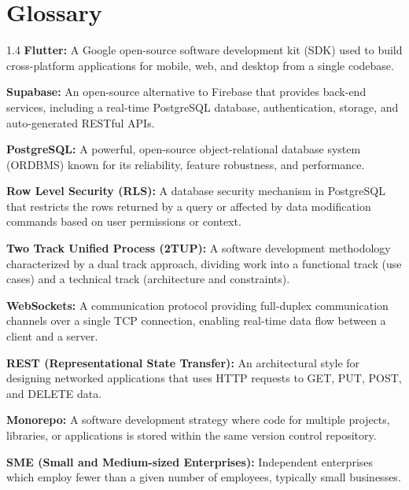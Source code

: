 \chapter*{Glossary}
\begin{spacing}{1.4}
\noindent\textbf{Flutter:} A Google open-source software development kit (SDK) used to build cross-platform applications for mobile, web, and desktop from a single codebase.

\noindent\textbf{Supabase:} An open-source alternative to Firebase that provides back-end services, including a real-time PostgreSQL database, authentication, storage, and auto-generated RESTful APIs.

\noindent\textbf{PostgreSQL:} A powerful, open-source object-relational database system (ORDBMS) known for its reliability, feature robustness, and performance.

\noindent\textbf{Row Level Security (RLS):} A database security mechanism in PostgreSQL that restricts the rows returned by a query or affected by data modification commands based on user permissions or context.

\noindent\textbf{Two Track Unified Process (2TUP):} A software development methodology characterized by a dual track approach, dividing work into a functional track (use cases) and a technical track (architecture and constraints).

\noindent\textbf{WebSockets:} A communication protocol providing full-duplex communication channels over a single TCP connection, enabling real-time data flow between a client and a server.

\noindent\textbf{REST (Representational State Transfer):} An architectural style for designing networked applications that uses HTTP requests to GET, PUT, POST, and DELETE data.

\noindent\textbf{Monorepo:} A software development strategy where code for multiple projects, libraries, or applications is stored within the same version control repository.

\noindent\textbf{SME (Small and Medium-sized Enterprises):} Independent enterprises which employ fewer than a given number of employees, typically small businesses.
\end{spacing}
